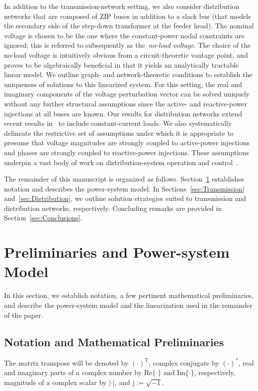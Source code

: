 \documentclass[10 pt, conference]{ieeeconf}
\begin{document}
In addition to the transmission-network setting, we also consider distribution networks that are composed of $\mathrm{ZIP}$ buses in addition to a slack bus (that models the secondary side of the step-down transformer at the feeder head). The nominal voltage is chosen to be the one where the constant-power nodal constraints are ignored; this is referred to subsequently as the~\emph{no-load voltage}. The choice of the no-load voltage is intuitively obvious from a circuit-theoretic vantage point, and proves to be algebraically beneficial in that it yields an analytically tractable linear model. We outline graph- and network-theoretic conditions to establish the uniqueness of solutions to this linearized system. For this setting, the real and imaginary components of the voltage perturbation vector can be solved uniquely without any further structural assumptions since the active- and reactive-power injections at all buses are known. Our results for distribution networks extend recent results in~\cite{Bolognani-2015} to include constant-current loads. We also systematically delineate the restrictive set of assumptions under which it is appropriate to presume that voltage magnitudes are strongly coupled to active-power injections and phases are strongly coupled to reactive-power injections. These assumptions underpin a vast body of work on distribution-system operation and control~\cite{Robbins-2013,Zhong-2013,Emiliano-2015}. 
 
The remainder of this manuscript is organized as follows. Section~\ref{sec:Prelim} establishes notation and describes the power-system model. In Sections~\ref{sec:Transmission} and~\ref{sec:Distribution}, we outline solution strategies suited to transmission and distribution networks, respectively. Concluding remarks are provided in Section~\ref{sec:Conclusions}.

\section{Preliminaries and Power-system Model}
\label{sec:Prelim}

In this section, we establish notation, a few pertinent mathematical preliminaries, and describe the power-system model and the linearization used in the remainder of the paper. 

\subsection{Notation and Mathematical Preliminaries}
The matrix transpose will be denoted by $(\cdot)^\mathrm{T}$, complex conjugate by $(\cdot)^*$, real and imaginary parts of a complex number by $\mathrm{Re}\{\cdot\}$ and $\mathrm{Im}\{\cdot\}$, respectively, magnitude of a complex scalar by $|\cdot|$, and $\mathrm{j} := \sqrt{-1}$. 
\end{document}
